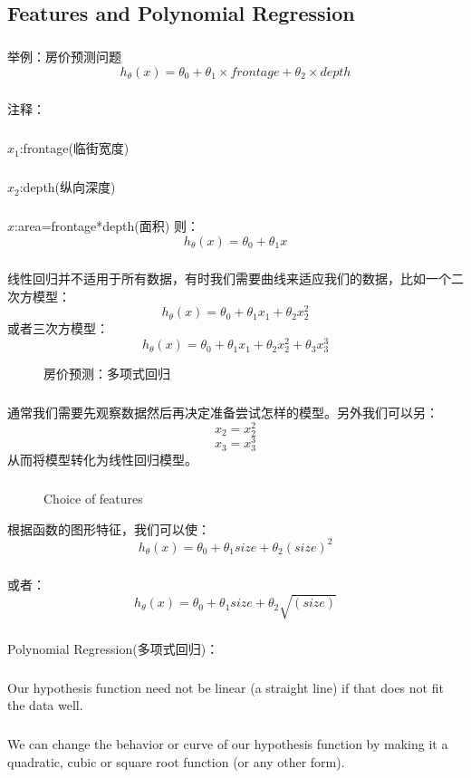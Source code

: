 \documentclass{article}
\begin{document}
\begin{CJK}{UTF8}{gbsn}
\subsection{Features and Polynomial Regression}
\subparagraph*{}
举例：房价预测问题
\begin{equation}
h_\theta(x)=\theta_0+\theta_1\times{frontage}+\theta_2\times{depth}
\end{equation}
\subparagraph*{}
注释：
\subparagraph*{}
$x_1$:frontage(临街宽度)
\subparagraph*{}
$x_2$:depth(纵向深度)
\subparagraph*{}
$x$:area=frontage*depth(面积)
则：\begin{equation}
h_\theta(x)=\theta_0+\theta_1x
\end{equation}
\subparagraph*{}
线性回归并不适用于所有数据，有时我们需要曲线来适应我们的数据，比如一个二次方模型：\begin{equation}
h_\theta(x)=\theta_0+\theta_1x_1+\theta_2x_2^2
\end{equation}
或者三次方模型：
\begin{equation}
h_\theta(x)=\theta_0+\theta_1x_1+\theta_2x_2^2+\theta_3x_3^3
\end{equation}
\begin{figure}[H]
\caption{房价预测：多项式回归}
\label{fig:228}
\end{figure}
\subparagraph*{}
通常我们需要先观察数据然后再决定准备尝试怎样的模型。另外我们可以另：
\begin{equation}
x_2=x_2^2
\end{equation}
\begin{equation}
x_3=x_3^3
\end{equation}
从而将模型转化为线性回归模型。
\subparagraph*{}
\begin{figure}[H]
\caption{Choice of features}
\label{fig:229}
\end{figure}
根据函数的图形特征，我们可以使：
\begin{equation}
h_\theta(x)=\theta_0+\theta_1size+\theta_2(size)^2
\end{equation}
\subparagraph*{}
或者：
\begin{equation}
h_\theta(x)=\theta_0+\theta_1size+\theta_2\sqrt{(size)}
\end{equation}
\subparagraph*{}
Polynomial Regression(多项式回归)：
\subparagraph*{}
Our hypothesis function need not be linear (a straight line) if that does not fit the data well.
\subparagraph*{}
We can change the behavior or curve of our hypothesis function by making it a quadratic, cubic or square root function (or any other form).

\end{CJK}
\end{document}

